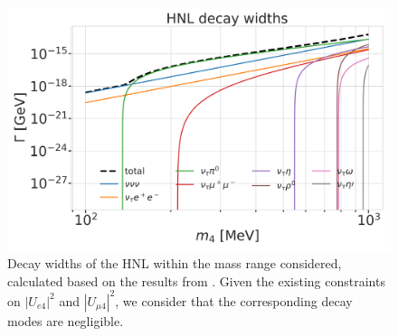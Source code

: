 \begin{figure}[h]
    \includegraphics{figures/hnl_simulation/decay_theory/hnl_decay_widths_up_to_1.0_GeV_log.png}
    \caption[HNL decay widths]{Decay widths of the HNL within the mass range considered, calculated based on the results from \cite{Coloma:2020lgy}. Given the existing constraints on $|U_{e4}|^{2}$ and $|U_{\mu4}|^{2}$, we consider that the corresponding decay modes are negligible.}
\end{figure}

